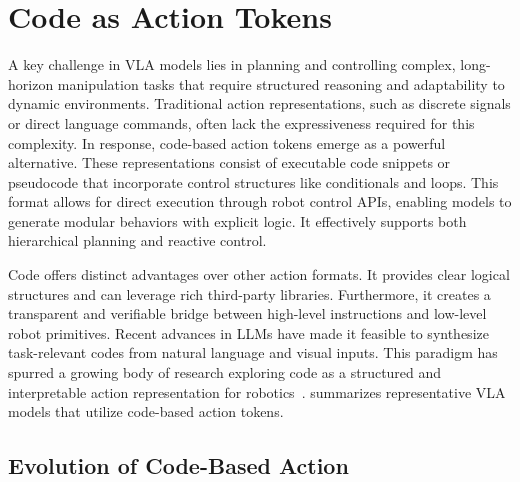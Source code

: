 \documentclass[10pt, a4paper, logo, copyright]{googledeepmind} %
\begin{document}
\section{Code as Action Tokens}
\label{sec:code}

A key challenge in VLA models lies in planning and controlling complex, long-horizon manipulation tasks that require structured reasoning and adaptability to dynamic environments. Traditional action representations, such as discrete signals or direct language commands, often lack the expressiveness required for this complexity. In response, code-based action tokens emerge as a powerful alternative. These representations consist of executable code snippets or pseudocode that incorporate control structures like conditionals and loops. This format allows for direct execution through robot control APIs, enabling models to generate modular behaviors with explicit logic. It effectively supports both hierarchical planning and reactive control.

Code offers distinct advantages over other action formats. It provides clear logical structures and can leverage rich third-party libraries. Furthermore, it creates a transparent and verifiable bridge between high-level instructions and low-level robot primitives. Recent advances in LLMs have made it feasible to synthesize task-relevant codes from natural language and visual inputs. This paradigm has spurred a growing body of research exploring code as a structured and interpretable action representation for robotics~\cite{liang2023code, Singh2022ProgPromptGS, Vemprala2023ChatGPTFR, 10.5555/3692070.3693552, Chen2024RoboScriptCG, Lin_2023, Wang2025ChainofModalityLM, Huang2023Instruct2ActMM}.  summarizes representative VLA models that utilize code-based action tokens.


\subsection{Evolution of Code-Based Action}
\end{document}
